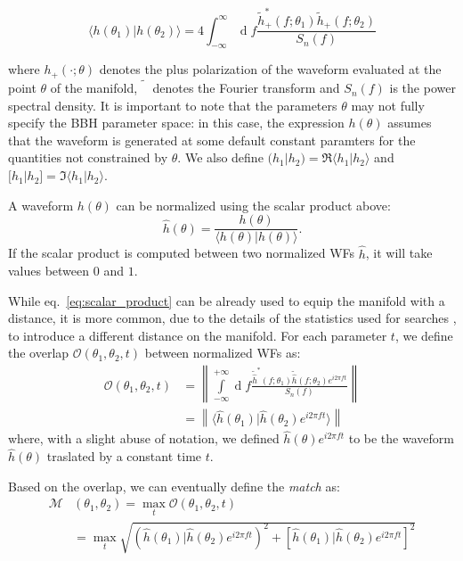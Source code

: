 \documentclass[twocolumn,showpacs,preprintnumbers,nofootinbib,prd,
superscriptaddress,10pt]{revtex4-2}
\renewcommand{\d}[1]{\ensuremath{\operatorname{d}\!{#1}}}
\newcommand{\scalar}[2]{\langle #1|#2 \rangle}
\newcommand{\rescalar}[2]{( #1|#2 )}
\newcommand{\imscalar}[2]{[ #1|#2 ]}
\begin{document}
\begin{equation} \label{eq:scalar_product}
	\scalar{h(\theta_1)}{h(\theta_2)} = 4 \int_{-\infty}^{\infty} \d{f} \frac{\tilde{h}_+^*(f;\theta_1) \tilde{h}_+(f;\theta_2)}{S_n(f)}
\end{equation}

where $h_+(\cdot; \theta)$ denotes the plus polarization of the waveform evaluated at the point $\theta$ of the manifold, $\tilde{\phantom{h}}$ denotes the Fourier transform and $S_n(f)$ is the power spectral density.
It is important to note that the parameters $\theta$ may not fully specify the BBH parameter space: in this case, the expression $h(\theta)$ assumes that the waveform is generated at some default constant paramters for the quantities not constrained by $\theta$.
We also define $\rescalar{h_1}{h_2} = \Re\scalar{h_1}{h_2}$ and $\imscalar{h_1}{h_2} = \Im\scalar{h_1}{h_2}$.

A waveform $h(\theta)$ can be normalized using the scalar product above:
\begin{equation} \label{eq:normalization}
	\hat{h}(\theta) = \frac{h(\theta)}{\scalar{h(\theta)}{h(\theta)}}.
\end{equation}
If the scalar product is computed between two normalized WFs $\hat{h}$, it will take values between $0$ and $1$.

While eq.~\eqref{eq:scalar_product} can be already used to equip the manifold with a distance, it is more common, due to the details of the statistics used for searches \cite{something}, to introduce a different distance on the manifold.
For each parameter $t$, we define the overlap $\mathcal{O}(\theta_1,\theta_2, t)$ between normalized WFs as:
\begin{align}\label{eq:overlap}
	\mathcal{O}(\theta_1,\theta_2, t) &= \left\| \int\limits_{-\infty}^{+\infty} \d{f} \frac{\tilde{\hat{h}}^*(f;\theta_1)\tilde{\hat{h}}(f;\theta_2) e^{i2\pi ft}}{S_n(f)} \right\| \nonumber\\
	&= \left\| \scalar{\hat{h}(\theta_1)}{\hat{h}(\theta_2)e^{i 2\pi ft}} \right\| 
\end{align}
where, with a slight abuse of notation, we defined $\hat{h}(\theta)e^{i 2\pi ft}$ to be the waveform $\hat{h}(\theta)$ traslated by a constant time $t$.

Based on the overlap, we can eventually define the {\it match} as:
\begin{align}\label{eq:match}
	\mathcal{M}&(\theta_1,\theta_2) = \max_t \mathcal{O}(\theta_1,\theta_2, t) \\
	&= \max_t \sqrt{ \rescalar{\hat{h}(\theta_1)}{\hat{h}(\theta_2)e^{i 2\pi ft}}^2 + \imscalar{\hat{h}(\theta_1)}{\hat{h}(\theta_2)e^{i2\pi ft}}^2 }  \nonumber 
\end{align}
\end{document}

